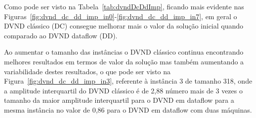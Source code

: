 Como pode ser visto na Tabela~\ref{tab:dvndDcDdImp}, ficando mais evidente nas Figuras~\ref{fig:dvnd_dc_dd_imp_in0}-\ref{fig:dvnd_dc_dd_imp_in7}, em geral o DVND clássico (DC) consegue melhorar mais o valor da solução inicial quando comparado ao DVND dataflow (DD).





Ao aumentar o tamanho das instâncias o DVND clássico continua encontrando melhores resultados em termos de valor da solução mas também aumentando a variabilidade destes resultados, o que pode ser visto na Figura~\ref{fig:dvnd_dc_dd_imp_in3}, referente à instância 3 de tamanho 318, onde a amplitude interquartil do DVND clássico é de 2,88 número mais de 3 vezes o tamanho da maior amplitude interquartil para o DVND em dataflow para a mesma instância no valor de 0,86 para o DVND em dataflow com duas máquinas.





